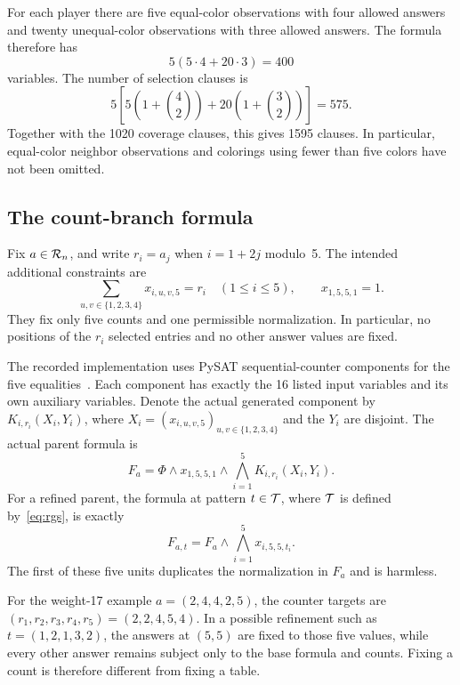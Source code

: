 For each player there are five equal-color observations with four allowed
answers and twenty unequal-color observations with three allowed answers.
The formula therefore has
\[
5(5\cdot4+20\cdot3)=400
\]
variables. The number of selection clauses is
\[
5\left[5\left(1+\binom42\right)+20\left(1+\binom32\right)\right]=575.
\]
Together with the 1020 coverage clauses, this gives 1595 clauses. In
particular, equal-color neighbor observations and colorings using fewer
than five colors have not been omitted.

\subsection{The count-branch formula}
Fix $a\in\mathcal{R}_n$, and write $r_i=a_j$ when $i=1+2j$ modulo~5.
The intended additional constraints are
\begin{equation}\label{eq:cardinality}
\sum_{u,v\in\{1,2,3,4\}}x_{i,u,v,5}=r_i
\quad(1\leq i\leq5),\qquad x_{1,5,5,1}=1.
\end{equation}
They fix only five counts and one permissible normalization. In
particular, no positions of the $r_i$ selected entries and no other answer
values are fixed.

The recorded implementation uses PySAT sequential-counter components
for the five equalities~\cite{pysat}. Each component has exactly the
16 listed input variables and its own auxiliary variables. Denote the
actual generated component by $K_{i,r_i}(X_i,Y_i)$, where
$X_i=(x_{i,u,v,5})_{u,v\in\{1,2,3,4\}}$ and the $Y_i$ are disjoint.
The actual parent formula is
\begin{equation}\label{eq:parent}
F_a=\Phi\land x_{1,5,5,1}\land\bigwedge_{i=1}^5K_{i,r_i}(X_i,Y_i).
\end{equation}
For a refined parent, the formula at pattern $t\in\mathcal{T}$, where $\mathcal{T}$
is defined by~\eqref{eq:rgs}, is exactly
\begin{equation}\label{eq:child}
F_{a,t}=F_a\land\bigwedge_{i=1}^5x_{i,5,5,t_i}.
\end{equation}
The first of these five units duplicates the normalization in $F_a$ and
is harmless.

For the weight-17 example $a=(2,4,4,2,5)$, the counter targets are
$(r_1,r_2,r_3,r_4,r_5)=(2,2,4,5,4)$. In a possible refinement such as
$t=(1,2,1,3,2)$, the answers at $(5,5)$ are fixed to those five values,
while every other answer remains subject only to the base formula and
counts. Fixing a count is therefore different from fixing a table.

